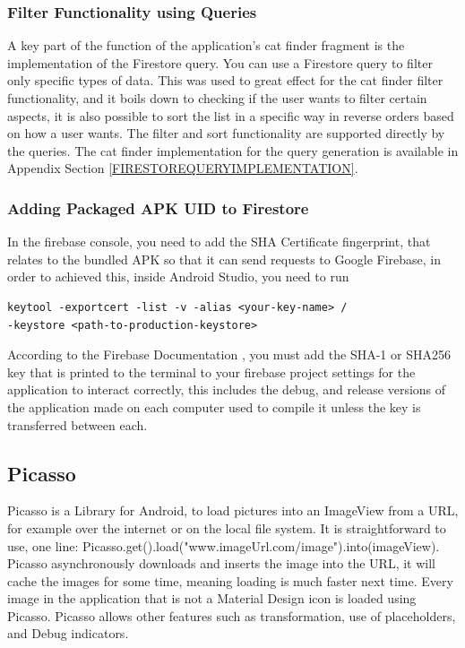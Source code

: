         \subsubsection{Filter Functionality using Queries}
        A key part of the function of the application's cat finder fragment is the implementation of the Firestore query. You can use a Firestore query to filter only specific types of data. This was used to great effect for the cat finder filter functionality, and it boils down to checking if the user wants to filter certain aspects, it is also possible to sort the list in a specific way in reverse orders based on how a user wants. The filter and sort functionality are supported directly by the queries. The cat finder implementation for the query generation is available in Appendix Section \ref{FIRESTOREQUERYIMPLEMENTATION}.
        
        \subsubsection{Adding Packaged APK UID to Firestore}
        In the firebase console, you need to add the SHA Certificate fingerprint, that relates to the bundled APK so that it can send requests to Google Firebase, in order to achieved this, inside Android Studio, you need to run 
        \begin{verbatim}
keytool -exportcert -list -v -alias <your-key-name> /
-keystore <path-to-production-keystore>
        \end{verbatim}
        According to the Firebase Documentation \cite{CLIENTAUTH}, you must add the SHA-1 or SHA256 key that is printed to the terminal to your firebase project settings for the application to interact correctly, this includes the debug, and release versions of the application made on each computer used to compile it unless the key is transferred between each.
        
    \subsection{Picasso}
    Picasso is a Library for Android, to load pictures into an ImageView from a URL, for example over the internet or on the local file system. It is straightforward to use, one line: Picasso.get().load("www.imageUrl.com/image").into(imageView). Picasso asynchronously downloads and inserts the image into the URL, it will cache the images for some time, meaning loading is much faster next time. Every image in the application that is not a Material Design icon is loaded using Picasso. Picasso allows other features such as transformation, use of placeholders, and Debug indicators.
